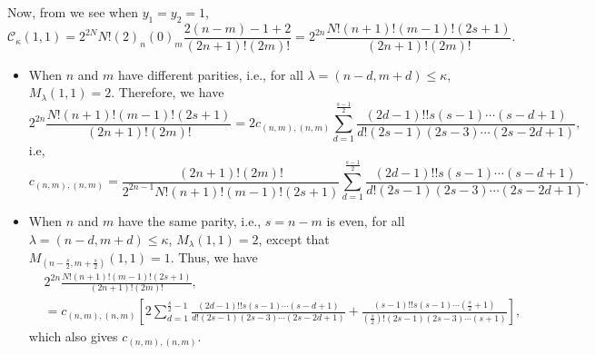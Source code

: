 \documentclass[10pt,oneside,american]{amsart}
\numberwithin{equation}{section}
\numberwithin{figure}{section}
\theoremstyle{plain}
\theoremstyle{definition}
\theoremstyle{remark}
\theoremstyle{plain}
\theoremstyle{definition}
\theoremstyle{plain}
\theoremstyle{plain}
\begin{document}
Now, from \cite[eq.~18, p.~237]{Muirhead} we see when $y_{1}=y_{2}=1$,
\[
\mathcal{C}_{\kappa}\left(1,1\right)=2^{2N}N!\left(2\right)_{n}\left(0\right)_{m}\frac{2\left(n-m\right)-1+2}{\left(2n+1\right)!\left(2m\right)!}=2^{2n}\frac{N!\left(n+1\right)!\left(m-1\right)!\left(2s+1\right)}{\left(2n+1\right)!\left(2m\right)!}.
\]
\begin{itemize}
\item When $n$ and $m$ have different parities, i.e., for all $\lambda=\left(n-d,m+d\right)\leq\kappa$,
$M_{\lambda}\left(1,1\right)=2$. Therefore, we have 
\[
2^{2n}\frac{N!\left(n+1\right)!\left(m-1\right)!\left(2s+1\right)}{\left(2n+1\right)!\left(2m\right)!}=2c_{\left(n,m\right),\left(n,m\right)}\sum_{d=1}^{\frac{s-1}{2}}\frac{\left(2d-1\right)!!s\left(s-1\right)\cdots\left(s-d+1\right)}{d!\left(2s-1\right)\left(2s-3\right)\cdots\left(2s-2d+1\right)},
\]
i.e, 
\[
c_{\left(n,m\right),\left(n,m\right)}=\frac{\left(2n+1\right)!\left(2m\right)!}{2^{2n-1}N!\left(n+1\right)!\left(m-1\right)!\left(2s+1\right)}\sum_{d=1}^{\frac{s-1}{2}}\frac{\left(2d-1\right)!!s\left(s-1\right)\cdots\left(s-d+1\right)}{d!\left(2s-1\right)\left(2s-3\right)\cdots\left(2s-2d+1\right)}.
\]
\item When $n$ and $m$ have the same parity, i.e., $s=n-m$ is even, for
all $\lambda=\left(n-d,m+d\right)\leq\kappa$, $M_{\lambda}\left(1,1\right)=2$,
except that $M_{\left(n-\frac{s}{2},m+\frac{s}{2}\right)}\left(1,1\right)=1$.
Thus, we have 
\begin{align*}
 & 2^{2n}\frac{N!\left(n+1\right)!\left(m-1\right)!\left(2s+1\right)}{\left(2n+1\right)!\left(2m\right)!},\\
 & =c_{\left(n,m\right),\left(n,m\right)}\left[2\sum_{d=1}^{\frac{s}{2}-1}\frac{\left(2d-1\right)!!s\left(s-1\right)\cdots\left(s-d+1\right)}{d!\left(2s-1\right)\left(2s-3\right)\cdots\left(2s-2d+1\right)}+\frac{\left(s-1\right)!!s\left(s-1\right)\cdots\left(\frac{s}{2}+1\right)}{\left(\frac{s}{2}\right)!\left(2s-1\right)\left(2s-3\right)\cdots\left(s+1\right)}\right],
\end{align*}
which also gives $c_{(n,m),(n,m)}$. 
\end{itemize}




\end{document}
